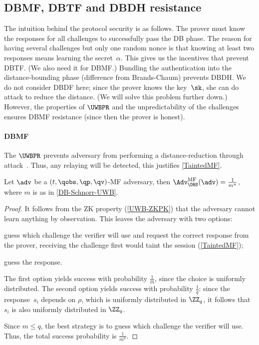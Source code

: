\subsection{\acs*{DBMF}, \acs*{DBTF} and \acs*{DBDH} resistance}

The intuition behind the protocol security is as follows.
The prover must know the responses for all challenges to successfully pass the 
\ac{DB} phase.
The reason for having several challenges but only one random nonce is that 
knowing at least two responses means learning the secret~\(\alpha\).
This gives us the incentives that prevent \ac{DBTF}.
(We also need it for \ac{DBMF}.)
Bundling the authentication into the distance-bounding phase (difference from 
Brands-Chaum) prevents \ac{DBDH}.
We do not consider \ac{DBDF} here; since the prover knows the key~\(\sk\), she 
can do  attack to reduce the distance.
(We will solve this problem further down.)
However, the properties of \(\UWBPR\) and the unpredictability of the 
challenges ensures \ac{DBMF} resistance (since then the prover is honest).

\paragraph{\Acl{DBMF}}

The \(\UWBPR\) prevents  adversary from performing a 
distance-reduction through  attack~\cite{UWBPR}.
Thus, any relaying will be detected, \ie this justifies \cref{TaintedMF}.

\begin{theorem}
  Let \(\adv\) be a \((t, \qobs, \qp, \qv)\)-MF adversary, then 
  \(\Adv_{\DBS}^{\text{MF}}(\adv) = \frac{1}{m^n}\), where \(m\) is as in 
  \cref{DB-Schnorr-UWB}.
\end{theorem}

\begin{proof}
  It follows from the \ac{ZK} property (\cref{UWB-ZKPK}) that the adversary 
  cannot learn anything by observation.
  This leaves the adversary with two options:
  \begin{enumerate*}
  \item guess which challenge the verifier will use and request the correct 
    response from the prover, receiving the challenge first would taint the 
    session (\cref{TaintedMF});
  \item guess the response.
  \end{enumerate*}
  The first option yields success with probability \(\frac{1}{m}\), since the 
  choice is uniformly distributed.
  The second option yields success with probability \(\frac{1}{q}\): since the 
  response~\(s_i\) depends on \(\rho\), which is uniformly distributed in 
  \(\ZZ_q\), it follows that \(s_i\) is also uniformly distributed in 
  \(\ZZ_q\).

  Since \(m \leq q\), the best strategy is to guess which challenge the 
  verifier will use.
  Thus, the total success probability is \(\frac{1}{m^n}\).
\end{proof}

